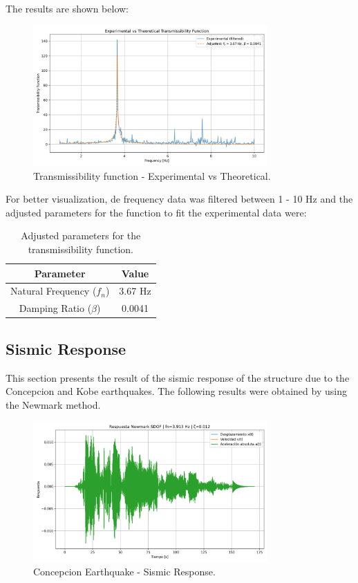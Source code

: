 \documentclass{article}  %
\begin{document}
The results are shown below:

\begin{figure}[H]
  \centering
  \includegraphics[width=0.8\textwidth]{GRAFICOS/TR_vs_teorico.png}
  \caption{Transmissibility function - Experimental vs Theoretical.}
  \label{fig:transmissibility}
\end{figure}

For better visualization, de frequency data was filtered between 1 - 10 Hz and the adjusted parameters for the function to fit the experimental data were:

\begin{table}[H]
\centering
\caption{Adjusted parameters for the transmissibility function.}
\begin{tabular}{|c|c|}
\hline
\textbf{Parameter} & \textbf{Value} \\ \hline
Natural Frequency ($f_n$) & 3.67 Hz \\ \hline
Damping Ratio ($\beta$) & 0.0041 \\ \hline
\end{tabular}
\end{table}

\subsection{Sismic Response}

This section presents the result of the sismic response of the structure due to the Concepcion and Kobe earthquakes. The following results were obtained by using the Newmark method.

\begin{figure}[H]
  \centering
  \includegraphics[width=0.8\textwidth]{GRAFICOS/respnewmark_Concepcion.png}
  \caption{Concepcion Earthquake - Sismic Response.}
  \label{fig:concepcion}
\end{figure}
\end{document}
